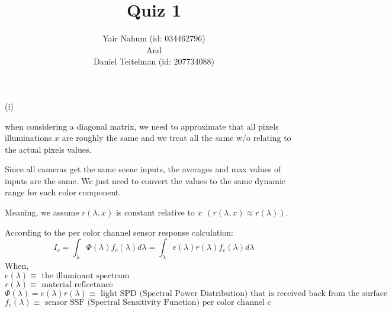 \documentclass{homework}
\title{Quiz 1}
\author{Yair Nahum (id: 034462796)\\And\\Daniel Teitelman (id: 207734088)}
\begin{document}
\maketitle


(i) 

when considering a diagonal matrix, we need to approximate that all pixels illuminations $x$ are roughly the same and we treat all the same w/o relating to the actual pixels values.

Since all cameras get the same scene inputs, the averages and max values of inputs are the same. We just need to convert the values to the same dynamic range for each color component.

Meaning, we assume $r(\lambda , x)$ is constant relative to $x \hspace{5pt} ( r(\lambda,x)\approx r(\lambda) )$.

According to the per color channel sensor response calculation:
$$I_c=\int_{\lambda} \Phi(\lambda)f_c(\lambda)d\lambda=\int_{\lambda} e(\lambda)r(\lambda)f_c(\lambda)d\lambda$$
When,\\
$e(\lambda) \equiv \text{ the illuminant spectrum} $\\
$r(\lambda) \equiv \text{ material reflectance} $\\
$\Phi(\lambda) = e(\lambda)r(\lambda) \equiv \text{ light SPD (Spectral Power Distribution) that is received back from the surface} $\\
$f_c(\lambda) \equiv \text{ sensor SSF (Spectral Sensitivity Function) per color channel } c$
\end{document}
